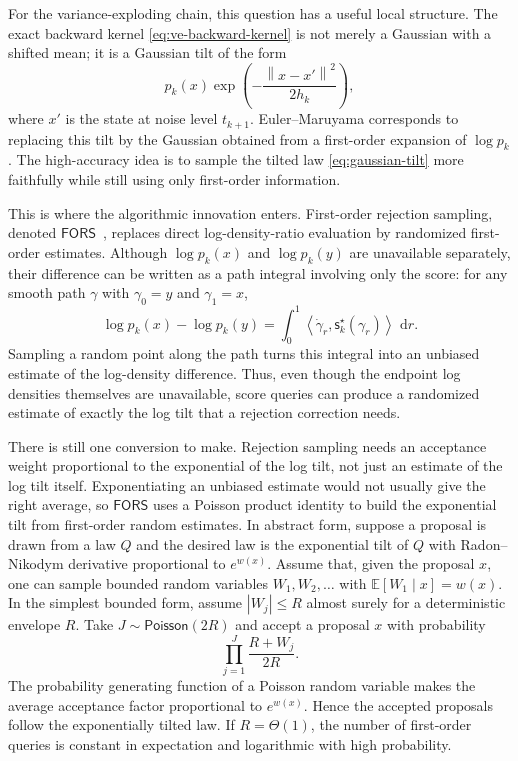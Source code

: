 \documentclass[10pt,a4paper]{amsart}
\numberwithin{equation}{section}
\newcommand{\E}{\mathbb{E}}
\newcommand{\dd}{\,\mathrm{d}}
\newcommand{\norm}[1]{\left\lVert #1 \right\rVert}
\newcommand{\ip}[2]{\left\langle #1,#2 \right\rangle}
\newcommand{\sstar}{\mathsf{s}^{\star}}
\newcommand{\Poi}{\mathsf{Poisson}}
\newcommand{\AlgFORS}{\textsf{FORS}}
\begin{document}
For the variance-exploding chain, this question has a useful local structure.
The exact backward kernel \eqref{eq:ve-backward-kernel} is not merely a
Gaussian with a shifted mean; it is a Gaussian tilt of the form
\begin{equation}\label{eq:gaussian-tilt}
    p_k(x)\exp\!\left(-\frac{\norm{x-x'}^2}{2h_k}\right),
\end{equation}
where $x'$ is the state at noise level $t_{k+1}$.  Euler--Maruyama corresponds
to replacing this tilt by the Gaussian obtained from a first-order expansion of
$\log p_k$.  The high-accuracy idea is to sample the tilted law
\eqref{eq:gaussian-tilt} more faithfully while still using only first-order
information.

This is where the algorithmic innovation enters.  First-order rejection
sampling, denoted $\AlgFORS$~\cite{chen2026highaccuracy}, replaces direct
log-density-ratio evaluation by randomized first-order estimates.  Although
$\log p_k(x)$ and $\log p_k(y)$ are unavailable separately, their difference
can be written as a path integral involving only the score: for any smooth path
$\gamma$ with $\gamma_0=y$ and $\gamma_1=x$,
\[
    \log p_k(x)-\log p_k(y)
    =
    \int_0^1
    \ip{\dot\gamma_r}{\sstar_k(\gamma_r)}\,\dd r.
\]
Sampling a random point along the path turns this integral into an unbiased
estimate of the log-density difference.  Thus, even though the endpoint log
densities themselves are unavailable, score queries can produce a randomized
estimate of exactly the log tilt that a rejection correction needs.

There is still one conversion to make.  Rejection sampling needs an acceptance
weight proportional to the exponential of the log tilt, not just an estimate of
the log tilt itself.  Exponentiating an unbiased estimate would not usually
give the right average, so $\AlgFORS$ uses a Poisson product identity to build
the exponential tilt from first-order random estimates.  In abstract form,
suppose a proposal is drawn from a law $Q$ and the desired law is the
exponential tilt of $Q$ with Radon--Nikodym derivative proportional to
$e^{w(x)}$.  Assume that, given the proposal $x$, one can sample bounded random
variables $W_1,W_2,\ldots$ with $\E[W_1\mid x]=w(x)$.  In the simplest bounded
form,
assume $|W_j|\leq R$ almost surely for a deterministic envelope $R$.  Take
$J\sim\Poi(2R)$ and accept a proposal $x$ with probability
\[
    \prod_{j=1}^{J}\frac{R+W_j}{2R}.
\]
The probability generating function of a Poisson random variable makes the
average acceptance factor proportional to $e^{w(x)}$.  Hence the accepted
proposals follow the exponentially tilted law.  If $R=\Theta(1)$, the number of
first-order queries is constant in expectation and logarithmic with high
probability.
\end{document}
